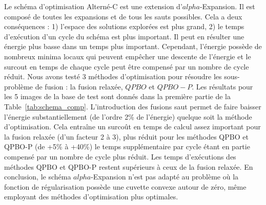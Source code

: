 \documentclass[../main/These_Mathias_Paget.tex]{subfiles}
\begin{document}
	Le schéma d'optimisation Alterné-C est une extension d'$alpha$-Expansion. Il est composé de toutes les expansions et de tous les sauts possibles. Cela a deux conséquences : 1) l'espace des solutions explorées est plus grand, 2) le temps d'exécution d'un cycle du schéma est plus important. Il peut en résulter une énergie plus basse dans un temps plus important. Cependant, l’énergie possède de nombreux minima locaux qui peuvent empêcher une descente de l’énergie et le surcout en temps de chaque cycle peut être compensé par un nombre de cycle réduit. Nous avons testé 3 méthodes d'optimisation pour résoudre les sous-problème de fusion : la fusion relaxée, $QPBO$ et $QPBO{-}P$. Les résultats pour les 5 images de la base de test sont donnés dans la première partie de la Table~\ref{tab:schema_comp}. L'introduction des fusions saut permet de faire baisser l’énergie substantiellement (de l'ordre 2\% de l’énergie) quelque soit la méthode d'optimisation. Cela entraîne un surcoût en temps de calcul assez important pour la fusion relaxée (d'un facteur 2 à 3), plus réduit pour les méthodes QPBO et QPBO-P (de +5\% à +40\%) le temps supplémentaire par cycle étant en partie compensé par un nombre de cycle plus réduit. Les temps d’exécutions des méthodes QPBO et QPBO-P restent supérieurs à ceux de la fusion relaxée. En conclusion, le schéma $alpha$-Expansion n'est pas adapté au problème où la fonction de régularisation possède une cuvette convexe autour de zéro, même employant des méthodes d'optimisation plus optimales.
		
\end{document}
